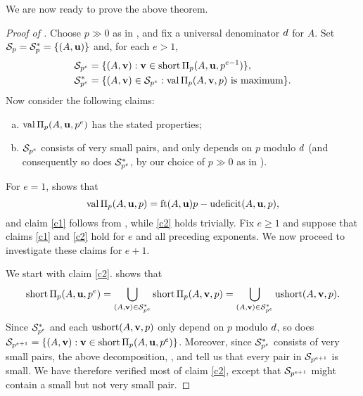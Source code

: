 \documentclass{amsart}
\begin{document}
We are now ready to prove the above theorem.

\begin{proof}[Proof of ]
   Choose $p \gg 0$ as in , and fix a universal denominator $\denom$ for $A$.
   Set $\S_p = \S^*_p = \{ (A,\vv{u}) \}$ and, for each $e > 1$,
   \begin{align*}
   \S_{p^{e}} &= \{ (A,\vv{v}):  \vv{v} \in \short \IP_p(A,\vv{u},p^{e-1}) \},\\
   \S^*_{p^{e}} &= \{ (A,\vv{v}) \in \S_{p^{e}}:  \val\IP_p(A,\vv{v},p)\text{ is maximum} \}.
   \end{align*}
   Now consider the following claims:
   \begin{enumerate}[(a),leftmargin=*]
      \item\label{c1} $\val \IP_p(A,\vv{u},p^e)$ has the stated properties;
      \item\label{c2} $\S_{p^e}$ consists of very small pairs, and only depends on $p$ modulo $\denom$ (and consequently so does $\S^*_{p^e}$, by our choice of $p\gg 0$ as in ).
   \end{enumerate}
   For $e=1$,  shows that
   \[ \val \IP_p(A,\vv{u},p) = \ft{A}{\vv{u}}p-\udeficit(A,\vv{u},p),\]
   and claim \ref{c1} follows from , while \ref{c2} holds trivially.
   Fix $e\ge 1$ and suppose that claims \ref{c1} and \ref{c2} hold for $e$ and all preceding exponents.
   We now proceed to investigate these claims for $e+1$.

   We start with claim \ref{c2}.
    shows that
   \[\short \IP_p(A,\vv{u},p^{e}) = \bigcup_{(A,\vv{v}) \in \S^*_{p^e}} \short \IP_p(A,\vv{v}, p)
      = \bigcup_{(A,\vv{v}) \in \S^*_{p^e}} \ushort(A,\vv{v}, p).\]
   Since $\S^*_{p^e}$ and each $\ushort(A,\vv{v}, p)$ only depend on $p$ modulo $\denom$, so does $\S_{p^{e+1}} = \{(A,\vv{v}): \vv{v}\in \short \IP_p(A,\vv{u},p^{e})\}$.
   Moreover, since $\S^*_{p^e}$ consists of very small pairs, the above decomposition, , and  tell us that every pair in $\S_{p^{e+1}}$ is small.
   We have therefore verified most of claim \ref{c2}, except that $\S_{p^{e+1}}$ might contain a small but not very small pair.


\end{proof}
\end{document}
